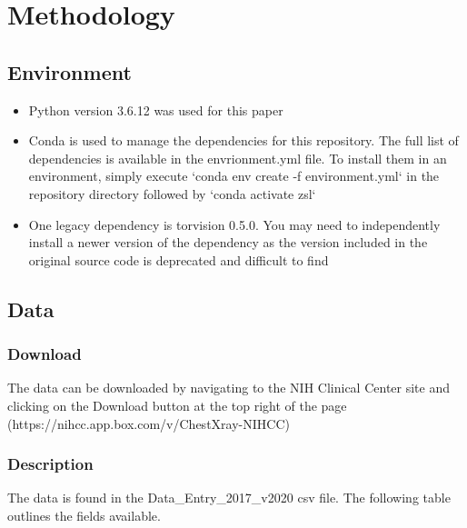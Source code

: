 \documentclass[letterpaper]{article} %
\begin{document}
\section{Methodology}

\subsection{Environment}
\begin{itemize}
    \item Python version 3.6.12 was used for this paper
    \item Conda is used to manage the dependencies for this repository. The full list of dependencies is available in the envrionment.yml file. To install them in an environment, simply execute `conda env create -f environment.yml` in the repository directory followed by `conda activate zsl`
    \item One legacy dependency is torvision 0.5.0. You may need to independently install a newer version of the dependency as the version included in the original source code is deprecated and difficult to find
\end{itemize}

\subsection{Data}

\subsubsection{Download}
The data can be downloaded by navigating to the NIH Clinical Center site and clicking on the Download button at the top right of the page (https://nihcc.app.box.com/v/ChestXray-NIHCC)

\subsubsection{Description}
The data is found in the Data\_Entry\_2017\_v2020 csv file. The following table outlines the fields available.


\newblock
\end{document}
